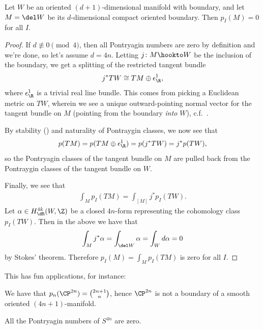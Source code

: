 \documentclass[11pt]{book}
\begin{document}
\begin{lemma}\label{lem:pontryagin-numbers-of-boundary-are-zero} 
Let $W$ be an oriented $(d+1)$-dimensional manifold with boundary, and let $M = \del W$ be its $d$-dimensional compact oriented boundary. Then $p_I(M) = 0$ for all $I$.
\end{lemma}
\begin{proof} If $d \not\equiv 0\pmod{4}$, then all Pontryagin numbers are zero by definition and we're done, so let's assume $d = 4n$. Letting $j \colon M \hookto W$ be the inclusion of the boundary, we get a splitting of the restricted tangent bundle
\begin{align*}
    j^\ast TW \cong TM \oplus \epsilon_\R^1,
\end{align*}
where $\epsilon_\R^1$ is a trivial real line bundle. This comes from picking a Euclidean metric on $TW$, wherein we see a unique outward-pointing normal vector for the tangent bundle on $M$ (pointing from the boundary \emph{into} $W$), c.f.~\cite[4.9]{MilnorStasheff}.

By stability () and naturality of Pontraygin classes, we now see that
\begin{align*}
    p(TM) = p(TM \oplus \epsilon_\R^1) = p(j^\ast TW) = j^\ast p(TW),
\end{align*}
so the Pontryagin classes of the tangent bundle on $M$ are pulled back from the Pontraygin classes of the tangent bundle on $W$.

Finally, we see that
\begin{align*}
    \int_M p_I(TM) = \int_{[M]} j^\ast p_I(TW).
\end{align*}
Let $\alpha \in H_{\dR}^{4k}(W,\Z)$ be a closed $4n$-form representing the cohomology class $p_I(TW)$. Then in the above we have that
\begin{align*}
    \int_M j^\ast \alpha = \int_{\del W} \alpha = \int_W d\alpha = 0
\end{align*}
by Stokes' theorem. Therefore $p_I(M) = \int_M p_I(TM)$ is zero for all $I$.
\end{proof}

This has fun applications, for instance:

\begin{example} We have that $p_n(\CP^{2n}) = \binom{2n+1}{n}$, hence $\CP^{2n}$ is not a boundary of a smooth oriented $(4n+1)$-manifold.
\end{example}

\begin{example} All the Pontryagin numbers of $S^{4n}$ are zero.
\end{example}
\end{document}
